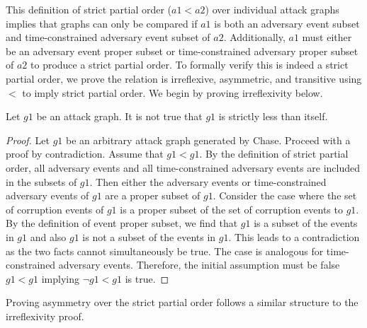 \documentclass[runningheads]{llncs}
\theoremstyle{definition}
\begin{document}
This definition of strict partial order ($a1 < a2$) over individual attack graphs implies that graphs can only be compared if $a1$ is both an adversary event subset and time-constrained adversary event subset of $a2$. Additionally, $a1$ must either be an adversary event proper subset or time-constrained adversary proper subset of $a2$ to produce a strict partial order. To formally verify this is indeed a strict partial order, we prove the relation is irreflexive, asymmetric, and transitive using $<$ to imply strict partial order. We begin by proving irreflexivity below.



\begin{theorem}
    Let $g1$ be an attack graph. It is not true that $g1$ is strictly less than itself.
\end{theorem}
\begin{proof}
    Let $g1$ be an arbitrary attack graph generated by Chase. Proceed with a proof by contradiction. Assume that $g1 < g1$. By the definition of strict partial order, all adversary events and all time-constrained adversary events are included in the subsets of $g1$. Then either the adversary events or time-constrained adversary events of $g1$ are a proper subset of $g1$. Consider the case where the set of corruption events of $g1$ is a proper subset of the set of corruption events to $g1$. By the definition of event proper subset, we find that $g1$ is a subset of the events in $g1$ and also $g1$ is not a subset of the events in $g1$. This leads to a contradiction as the two facts cannot simultaneously be true. The case is analogous for time-constrained adversary events.  Therefore, the initial assumption must be false $g1 < g1$ implying $\neg g1 < g1$ is true. 
\end{proof}

\noindent Proving asymmetry over the strict partial order follows a similar structure to the irreflexivity proof. 
\end{document}
